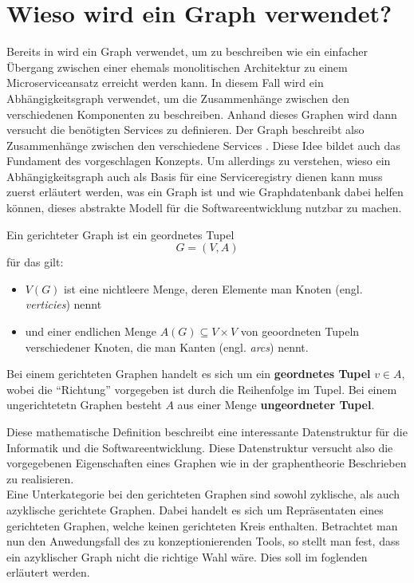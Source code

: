 \documentclass[
	12pt,
	BCOR=5mm,
	DIV=12,
	headinclude=on,
	footinclude=off,
	parskip=half,
	bibliography=totoc,
	listof=entryprefix,
	toc=listof,
	numbers=noenddot,
	plainfootsepline
]{scrreprt}
\begin{document}
\section{Wieso wird ein Graph verwendet?}

Bereits in \citeauthor{Ren2018} wird ein Graph verwendet, um zu beschreiben wie ein einfacher Übergang zwischen einer ehemals monolitischen Architektur zu einem Microserviceansatz erreicht werden kann. In diesem Fall wird ein Abhängigkeitsgraph verwendet, um die Zusammenhänge zwischen den verschiedenen Komponenten zu beschreiben. Anhand dieses Graphen wird dann versucht die benötigten Services zu definieren. Der Graph beschreibt also Zusammenhänge zwischen den verschiedene Services \autocite[Kapitel 3.2 \& Kapitel 3.3]{Ren2018}. Diese Idee bildet auch das Fundament des vorgeschlagen Konzepts. Um allerdings zu verstehen, wieso ein Abhängigkeitsgraph auch als Basis für eine Serviceregistry dienen kann muss zuerst erläutert werden, was ein Graph ist und wie Graphdatenbank dabei helfen können, dieses abstrakte Modell für die Softwareentwicklung nutzbar zu machen.

\begin{definition}\autocite[Kapitel 1.2]{Bang-Jensen2007}
	Ein gerichteter Graph ist ein geordnetes Tupel $$G = (V,A)$$ für das gilt:
	\begin{itemize}
		\item $V(G)$ ist eine nichtleere Menge, deren Elemente man Knoten (engl. \textit{verticies}) nennt
		\item und einer endlichen Menge $A(G) \subseteq V \times V$ von geoordneten Tupeln verschiedener Knoten, die man Kanten (engl. \textit{arcs}) nennt.
	\end{itemize}

	Bei einem gerichteten Graphen handelt es sich um ein \textbf{geordnetes Tupel} $v \in A$, wobei die \enquote{Richtung} vorgegeben ist durch die Reihenfolge im Tupel. Bei einem ungerichtetetn Graphen besteht $A$ aus einer Menge \textbf{ungeordneter Tupel}.
\end{definition}

Diese mathematische Definition beschreibt eine interessante Datenstruktur für die Informatik und die Softwareentwicklung. Diese Datenstruktur versucht also die vorgegebenen Eigenschaften eines Graphen wie in der graphentheorie Beschrieben zu realisieren. \\
Eine Unterkategorie bei den gerichteten Graphen sind sowohl zyklische, als auch azyklische gerichtete Graphen. Dabei handelt es sich um Repräsentaten eines gerichteten Graphen, welche keinen gerichteten Kreis enthalten. Betrachtet man nun den Anwedungsfall des zu konzeptionierenden Tools, so stellt man fest, dass ein azyklischer Graph nicht die richtige Wahl wäre. Dies soll im foglenden erläutert werden.
\end{document}
